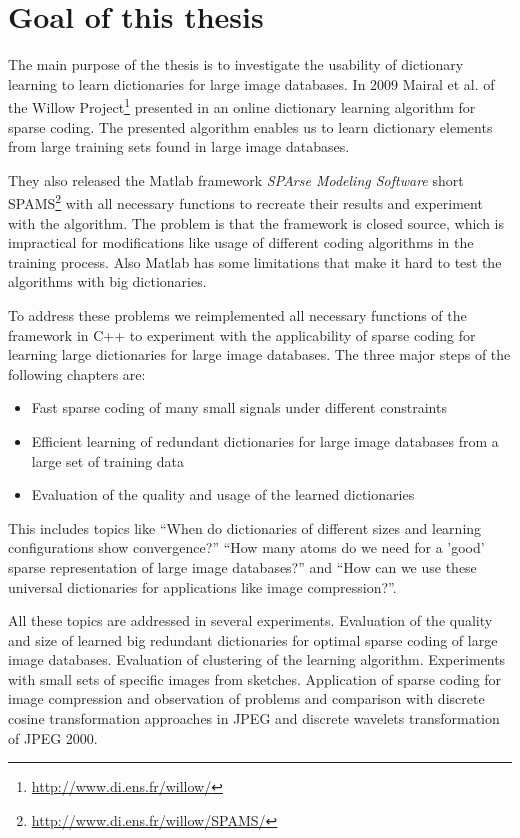 \section{Goal of this thesis}
The main purpose of the thesis is to investigate the usability of dictionary
learning to learn dictionaries for large image databases. 
In 2009 Mairal et al. of the Willow
Project\footnote{\url{http://www.di.ens.fr/willow/}} presented in
\cite{Mairal2009,Mairal2010} an online dictionary learning algorithm for sparse
coding. The presented algorithm enables us to learn dictionary elements from
large training sets found in large image databases.

They also released the Matlab framework \emph{SPArse Modeling Software}
short SPAMS\footnote{\url{http://www.di.ens.fr/willow/SPAMS/}} with all
necessary functions to recreate their results and experiment with the algorithm.
The problem is that the framework is closed source, which is impractical for
modifications like usage of different coding algorithms in the training process.
Also Matlab has some limitations that make it hard to test the algorithms with
big dictionaries.

To address these problems we reimplemented all necessary functions of the
framework in C++ to experiment with the applicability of sparse coding for
learning large dictionaries for large image databases. The three major steps of
the following chapters are:

\begin{itemize}
 \item Fast sparse coding of many small signals under different constraints
 \item Efficient learning of redundant dictionaries for large image databases
from a large set of training data
 \item Evaluation of the quality and usage of the learned dictionaries
\end{itemize}

This includes topics like 
``When do dictionaries of different sizes and learning configurations show
convergence?'' 
``How many atoms do we need for a 'good' sparse representation of large image
databases?''  and 
``How can we use these universal dictionaries for applications like
image compression?''. 

All these topics are addressed in several experiments.
Evaluation of the quality and size of learned big redundant dictionaries
for optimal sparse coding of large image databases. 
Evaluation of clustering of the learning algorithm. Experiments with small sets
of specific images from sketches. 
Application of sparse coding for image compression and observation of problems
and comparison with discrete cosine transformation approaches in JPEG and
discrete wavelets transformation of JPEG 2000.





